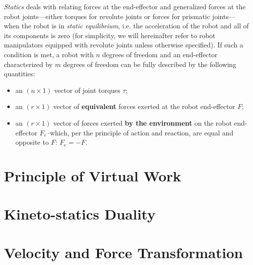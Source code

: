 \emph{Statics} deals with relating forces at the end-effector and generalized forces at the robot joints---either torques for revolute joints or forces for prismatic joints---when the robot is in \emph{static equilibrium}, i.e. the acceleration of the robot and all of its components is zero
(for simplicity, we will hereinafter refer to robot manipulators equipped with revolute joints unless otherwise specified).
If such a condition is met, a robot with $n$ degrees of freedom and an end-effector characterized by $m$ degrees of freedom can be fully described by the following quantities:
\begin{itemize}
    \item an $\left( n \times 1 \right)$ vector of joint torques $\tau$;
    \item an $\left( r \times 1 \right)$ vector of \textbf{equivalent} forces exerted at the robot end-effector $F$;
    \item an $\left( r \times 1 \right)$ vector of forces exerted \textbf{by the environment} on the robot end-effector $F_e$--which, per the principle of action and reaction, are equal and opposite to $F$: $F_e=-F$.
\end{itemize}

\vskip 40pt

\section{Principle of Virtual Work}

\section{Kineto-statics Duality}

\section{Velocity and Force Transformation}
